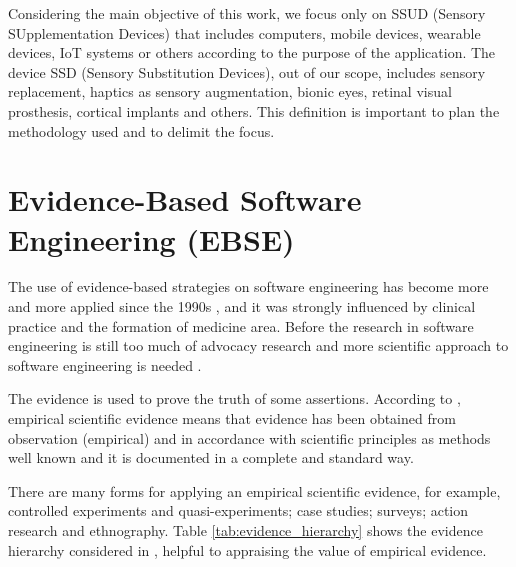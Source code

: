Considering the main objective of this work, we focus only on \gls{SSUD} (Sensory SUpplementation Devices) that includes computers, mobile devices, wearable devices, IoT systems or others according to the purpose of the application. The device \gls{SSD} (Sensory Substitution Devices), out of our scope, includes sensory replacement, haptics as sensory augmentation, bionic eyes, retinal visual prosthesis, cortical implants and others. This definition is important to plan the methodology used and to delimit the focus.

\section{Evidence-Based Software Engineering (\gls{EBSE})}
\label{sec:background-evidence-based}
The use of evidence-based strategies on software engineering has become more and more applied since the 1990s \cite{Shepperd2012}, and it was strongly influenced by clinical practice and the formation of medicine area. Before the research in software engineering is still too much of advocacy research and more scientific approach to software engineering is needed \cite{Wohlin2000}.

The evidence is used to prove the truth of some assertions. According to , empirical scientific evidence means that evidence has been obtained from observation (empirical) and in accordance with scientific principles as methods well known and it is documented in a complete and standard way. 

There are many forms for applying an empirical scientific evidence, for example, controlled experiments and quasi-experiments; case studies; surveys; action research and ethnography. Table \ref{tab:evidence_hierarchy} shows the evidence hierarchy considered in , helpful to appraising the value of empirical evidence.

